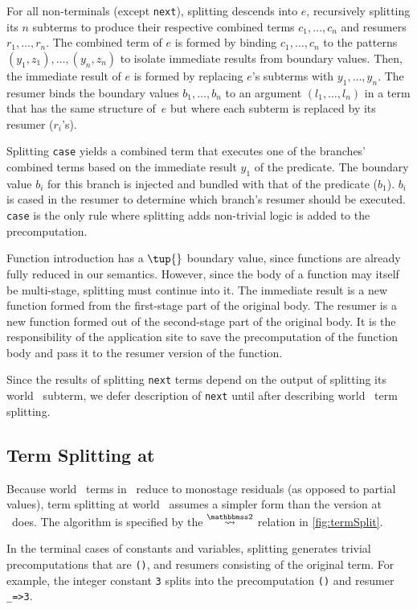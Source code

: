 \begin{abstrsyn}
For all non-terminals (except \texttt{next}),
splitting descends into $e$, recursively splitting its $n$ subterms
to produce their respective combined terms $c_1,\ldots,c_n$ and resumers $r_1, \ldots, r_n$.
The combined term of $e$ is formed by binding $c_1,\ldots,c_n$
to the patterns $(y_1,z_1),\ldots,(y_n,z_n)$
to isolate immediate results from boundary values. Then,
the immediate result of $e$ is formed by replacing $e$'s subterms with $y_1,\ldots,y_n$.
The resumer binds the boundary values $b_1,\ldots,b_n$ to an
argument $(l_1,\ldots,l_n)$ in a term that has the same structure
of~$e$ but where each subterm is replaced by its resumer ($r_i$'s).

Splitting {\tt case} yields a combined term that executes one of the branches' combined terms based on the immediate result $y_1$ of the predicate.
The boundary value $b_i$ for this branch is injected and bundled with that of the predicate ($b_1$).   
$b_i$ is cased in the resumer to determine which branch's resumer should be executed.
{\tt case} is the only rule where splitting adds non-trivial logic is added to the precomputation.

Function introduction has a $\tup{}$ boundary value,
since functions are already fully reduced in our semantics.
However, since the body of a function may itself be multi-stage, splitting must continue into it.
The immediate result is a new function formed from the first-stage part of the original body.
The resumer is a new function formed out of the second-stage part of the original body.
It is the responsibility of the application site to save the precomputation of the function body
and pass it to the resumer version of the function.

Since the results of splitting \texttt{next} terms depend on the output of
splitting its world \bbtwo\ subterm,
we defer description of \texttt{next} until after describing world \bbtwo\ term splitting.

\subsection{Term Splitting at \bbtwo}

Because world \bbtwo\ terms in \lang\ reduce to monostage residuals (as opposed to partial values),
term splitting at world \bbtwo\ assumes a simpler form than the version at \bbonem\ does. 
The algorithm is specified by the $\splittwosym$ relation in \cref{fig:termSplit}.

In the terminal cases of
constants and variables, splitting generates trivial precomputations that are \texttt{()}, and resumers consisting of the original term.
For example, the integer constant \texttt{3} splits into the
precomputation \texttt{()} and resumer \texttt{\_=>3}.


\end{abstrsyn}
